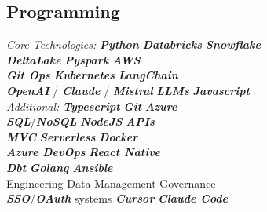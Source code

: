 \documentclass[]{deedy-resume-reversed}
\begin{document}
\begin{multicols}{2}
\subsection{Programming}
\textit{Core Technologies:} \newline
\textbf{\textit{Python}} \textbullet{} \textbf{\textit{Databricks}}  \textbullet{} \textbf{\textit{Snowflake}} \\
\textbf{\textit{DeltaLake}} \textbullet{} \textbf{\textit{Pyspark}}  \textbullet{} \textbf{\textit{AWS}} \\
\textbf{\textit{Git Ops}} \textbullet{} \textbf{\textit{Kubernetes}} \textbullet{} \textbf{\textit{LangChain}} \\
\textbf{\textit{OpenAI}} / \textbf{\textit{Claude}} / \textbf{\textit{Mistral}} \textbullet{} \textbf{\textit{LLMs}} \textbullet{} \textbf{\textit{Javascript}} \\
\textit{Additional:} \newline
\textbf{\textit{Typescript}} \textbullet{} \textbf{\textit{Git}} \textbullet{} \textbf{\textit{Azure}} \\
\textbf{\textit{SQL}}/\textbf{\textit{NoSQL}} \textbullet{} \textbf{\textit{NodeJS}} \textbullet{} \textbf{\textit{APIs}} \\
\textbf{\textit{MVC}} \textbullet{} \textbf{\textit{Serverless}} \textbullet{} \textbf{\textit{Docker}} \\
\textbf{\textit{Azure DevOps}} \textbullet{} \textbf{\textit{React Native}} \\
\textbf{\textit{Dbt}} \textbullet{} \textbf{\textit{Golang}} \textbullet{} \textbf{\textit{Ansible}}  \\
Engineering Data Management \textbullet{} Governance \\
\textbf{\textit{SSO}}/\textbf{\textit{OAuth}} systems \textbullet{} \textbf{\textit{Cursor}} \textbullet{} \textbf{\textit{Claude Code}} \\

\sectionsep




\needspace{2cm}

\end{multicols}
\end{document}
